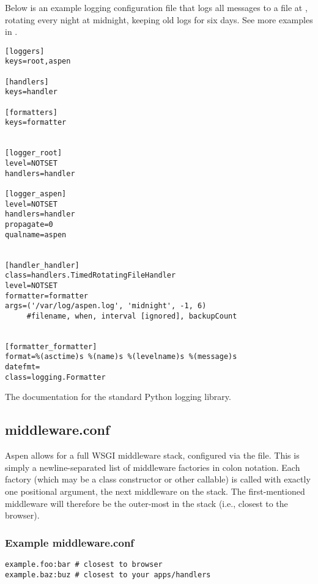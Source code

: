 Below is an example logging configuration file that logs all messages to a file
at , rotating every night at midnight, keeping old
logs for six days. See more examples in
.


\begin{verbatim}
[loggers]
keys=root,aspen

[handlers]
keys=handler

[formatters]
keys=formatter


[logger_root]
level=NOTSET
handlers=handler

[logger_aspen]
level=NOTSET
handlers=handler
propagate=0
qualname=aspen


[handler_handler]
class=handlers.TimedRotatingFileHandler
level=NOTSET
formatter=formatter
args=('/var/log/aspen.log', 'midnight', -1, 6)
     #filename, when, interval [ignored], backupCount


[formatter_formatter]
format=%(asctime)s %(name)s %(levelname)s %(message)s
datefmt=
class=logging.Formatter
\end{verbatim}

\begin{seealso}

{}{The documentation for the standard Python logging library.}

\end{seealso}


\subsection{middleware.conf}
\label{middleware-conf}

Aspen allows for a full WSGI middleware stack, configured via the
 file. This is simply a newline-separated list of
middleware factories in colon notation. Each factory (which may be a class
constructor or other callable) is called with exactly one positional argument,
the next middleware on the stack. The first-mentioned middleware will therefore
be the outer-most in the stack (i.e., closest to the browser).


\subsubsection{Example middleware.conf}

\begin{verbatim}
example.foo:bar # closest to browser
example.baz:buz # closest to your apps/handlers
\end{verbatim}


